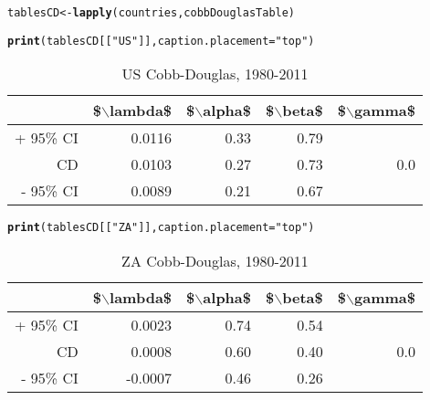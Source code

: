 \documentclass[preprint,authoryear,12pt]{elsarticle}\usepackage{graphicx, color}
\makeatletter
\newcommand{\hlfunctioncall}[1]{\textcolor[rgb]{0.501960784313725,0,0.329411764705882}{\textbf{#1}}}%
\newcommand{\hlstring}[1]{\textcolor[rgb]{0.6,0.6,1}{#1}}%
\newenvironment{kframe}{%
 \def\at@end@of@kframe{}%
 \ifinner\ifhmode%
  \def\at@end@of@kframe{\end{minipage}}%
  \begin{minipage}{\columnwidth}%
 \fi\fi%
 \def\FrameCommand##1{\hskip\@totalleftmargin \hskip-\fboxsep
 \colorbox{shadecolor}{##1}\hskip-\fboxsep
     \hskip-\linewidth \hskip-\@totalleftmargin \hskip\columnwidth}%
 \MakeFramed {\advance\hsize-\width
   \@totalleftmargin\z@ \linewidth\hsize
   \@setminipage}}%
 {\par\unskip\endMakeFramed%
 \at@end@of@kframe}
\newenvironment{knitrout}{}{} %
\makeatother
\begin{document}
\begin{knitrout}
\color{fgcolor}\begin{kframe}
\begin{alltt}
tablesCD <- \hlfunctioncall{lapply}(countries, cobbDouglasTable)
\end{alltt}


{\ttfamily\noindent\itshape\color{messagecolor}{Waiting for profiling to be done...}}

{\ttfamily\noindent\itshape\color{messagecolor}{Waiting for profiling to be done...}}\end{kframe}
\end{knitrout}


\begin{kframe}
\begin{alltt}
\hlfunctioncall{print}(tablesCD[[\hlstring{"US"}]], caption.placement=\hlstring{"top"})
\end{alltt}
\end{kframe}%
\begin{table}[ht]
\begin{center}
\caption{US Cobb-Douglas, 1980-2011}
\begin{tabular}{rrrrr}
  \hline
 & \$$\backslash$lambda\$ & \$$\backslash$alpha\$ & \$$\backslash$beta\$ & \$$\backslash$gamma\$ \\ 
  \hline
+ 95\% CI & 0.0116 & 0.33 & 0.79 &  \\ 
  CD & 0.0103 & 0.27 & 0.73 & 0.0 \\ 
  - 95\% CI & 0.0089 & 0.21 & 0.67 &  \\ 
   \hline
\end{tabular}
\end{center}
\end{table}
\begin{kframe}\begin{alltt}
\hlfunctioncall{print}(tablesCD[[\hlstring{"ZA"}]], caption.placement=\hlstring{"top"})
\end{alltt}
\end{kframe}%
\begin{table}[ht]
\begin{center}
\caption{ZA Cobb-Douglas, 1980-2011}
\begin{tabular}{rrrrr}
  \hline
 & \$$\backslash$lambda\$ & \$$\backslash$alpha\$ & \$$\backslash$beta\$ & \$$\backslash$gamma\$ \\ 
  \hline
+ 95\% CI & 0.0023 & 0.74 & 0.54 &  \\ 
  CD & 0.0008 & 0.60 & 0.40 & 0.0 \\ 
  - 95\% CI & -0.0007 & 0.46 & 0.26 &  \\ 
   \hline
\end{tabular}
\end{center}
\end{table}
\end{document}

